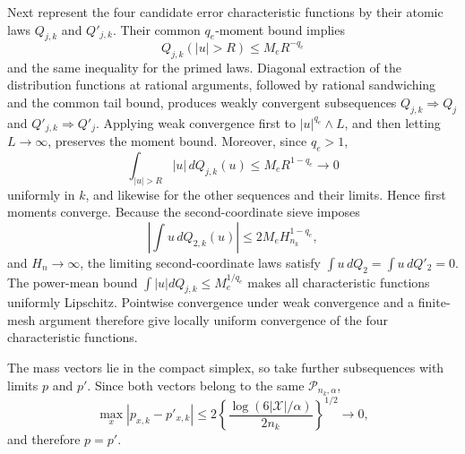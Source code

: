 Next represent the four candidate error characteristic functions by their atomic laws \(Q_{j,k}\) and \(Q'_{j,k}\). Their common \(q_e\)-moment bound implies
\[
 Q_{j,k}(|u|>R)\le M_eR^{-q_e}
\]
and the same inequality for the primed laws. Diagonal extraction of the distribution functions at rational arguments, followed by rational sandwiching and the common tail bound, produces weakly convergent subsequences \(Q_{j,k}\Rightarrow Q_j\) and \(Q'_{j,k}\Rightarrow Q'_j\). Applying weak convergence first to \(|u|^{q_e}\wedge L\), and then letting \(L\to\infty\), preserves the moment bound. Moreover, since \(q_e>1\),
\[
 \int_{|u|>R}|u|\,dQ_{j,k}(u)\le M_eR^{1-q_e}\longrightarrow0
\]
uniformly in \(k\), and likewise for the other sequences and their limits. Hence first moments converge. Because the second-coordinate sieve imposes
\[
 \left|\int u\,dQ_{2,k}(u)\right|
 \le2M_eH_{n_k}^{1-q_e},
\]
and \(H_n\to\infty\), the limiting second-coordinate laws satisfy \(\int u\,dQ_2=\int u\,dQ'_2=0\). The power-mean bound \(\int|u|dQ_{j,k}\le M_e^{1/q_e}\) makes all characteristic functions uniformly Lipschitz. Pointwise convergence under weak convergence and a finite-mesh argument therefore give locally uniform convergence of the four characteristic functions.

The mass vectors lie in the compact simplex, so take further subsequences with limits \(p\) and \(p'\). Since both vectors belong to the same \(\mathcal P_{n_k,\alpha}\),
\[
 \max_x|p_{x,k}-p'_{x,k}|
 \le2\left\{\frac{\log(6|\mathcal X|/\alpha)}{2n_k}\right\}^{1/2}
 \longrightarrow0,
\]
and therefore \(p=p'\).

